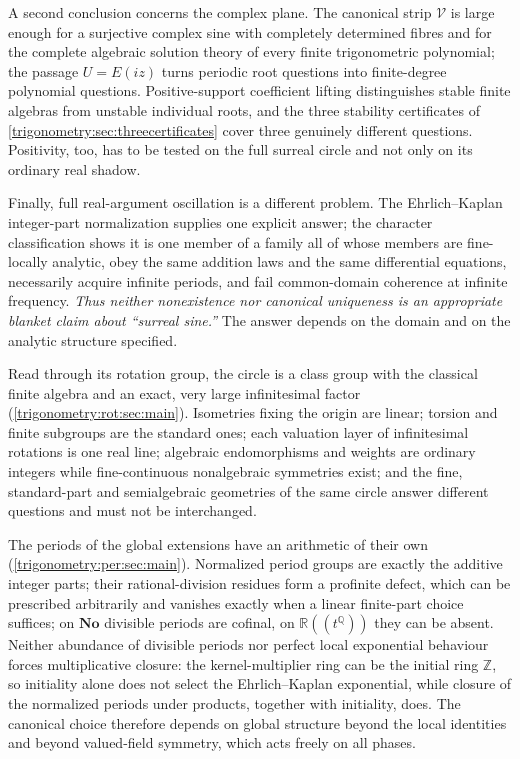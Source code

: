 \documentclass[11pt,letterpaper]{article}
\numberwithin{equation}{section}
\theoremstyle{definition}
\theoremstyle{remark}
\newcommand{\No}{\mathbf{No}}
\newcommand{\R}{\mathbb R}
\newcommand{\Q}{\mathbb Q}
\newcommand{\Z}{\mathbb Z}
\begin{document}
A second conclusion concerns the complex plane. The canonical strip $\mathscr V$ is large enough
for a surjective complex sine with completely determined fibres and for the complete algebraic
solution theory of every finite trigonometric polynomial; the passage $U=E(iz)$ turns periodic root
questions into finite-degree polynomial questions. Positive-support coefficient lifting
distinguishes stable finite algebras from unstable individual roots, and the three stability
certificates of \cref{trigonometry:sec:threecertificates} cover three genuinely different
questions. Positivity, too, has to be tested on the full surreal circle and not only on its
ordinary real shadow.

Finally, full real-argument oscillation is a different problem. The Ehrlich--Kaplan integer-part
normalization supplies one explicit answer; the character classification shows it is one member of
a family all of whose members are fine-locally analytic, obey the same addition laws and the same
differential equations, necessarily acquire infinite periods, and fail common-domain coherence at
infinite frequency. \emph{Thus neither nonexistence nor canonical uniqueness is an appropriate
blanket claim about ``surreal sine.''} The answer depends on the domain and on the analytic
structure specified.

Read through its rotation group, the circle is a class group with the classical finite algebra and
an exact, very large infinitesimal factor (\cref{trigonometry:rot:sec:main}). Isometries fixing the
origin are linear; torsion and finite subgroups are the standard ones; each valuation layer of
infinitesimal rotations is one real line; algebraic endomorphisms and weights are ordinary integers
while fine-continuous nonalgebraic symmetries exist; and the fine, standard-part and semialgebraic
geometries of the same circle answer different questions and must not be interchanged.

The periods of the global extensions have an arithmetic of their own (\cref{trigonometry:per:sec:main}).
Normalized period groups are exactly the additive integer parts; their rational-division residues form a
profinite defect, which can be prescribed arbitrarily and vanishes exactly when a linear finite-part
choice suffices; on $\No$ divisible periods are cofinal, on $\R((t^{\Q}))$ they can be absent. Neither
abundance of divisible periods nor perfect local exponential behaviour forces multiplicative closure:
the kernel-multiplier ring can be the initial ring $\Z$, so initiality alone does not select the
Ehrlich--Kaplan exponential, while closure of the normalized periods under products, together with
initiality, does. The
canonical choice therefore depends on global structure beyond the local identities and beyond
valued-field symmetry, which acts freely on all phases.
\end{document}
